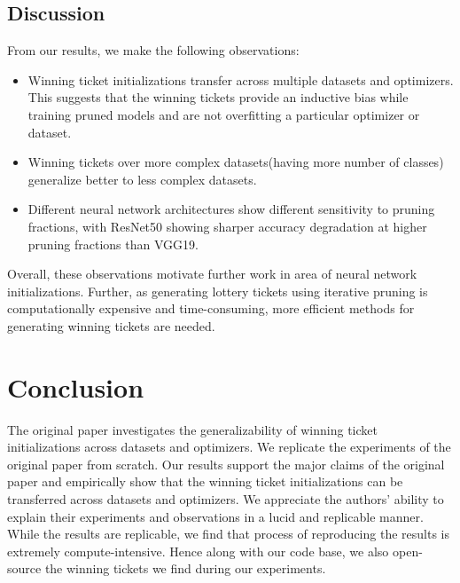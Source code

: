     \subsection{Discussion}
     From our results, we make the following observations:
    \begin{itemize}
        \item Winning ticket initializations transfer across multiple datasets and optimizers. This suggests that the winning tickets provide an inductive bias while training pruned models  and are not overfitting a particular optimizer or dataset.
        \item Winning tickets over more complex datasets(having more number of classes) generalize better to less complex datasets.
        \item  Different neural network architectures show different sensitivity to pruning fractions, with ResNet50 showing sharper accuracy degradation at higher pruning fractions than VGG19.
    \end{itemize}
     Overall, these observations motivate further work in area of neural network initializations. Further, as generating lottery tickets using iterative pruning is computationally expensive and time-consuming, more efficient methods for generating winning tickets are needed.
    
    

    \section{Conclusion}
    The original paper \cite{repro_paper} investigates the generalizability of winning ticket initializations across datasets and optimizers. We replicate the experiments of the original paper from scratch. Our results support the major claims of the original paper and empirically show that the winning ticket initializations can be transferred across datasets and optimizers. We appreciate the authors' ability to explain their experiments and observations in a lucid and replicable manner. While the results are replicable, we find that process of reproducing the results is extremely compute-intensive. Hence along with our code base, we also open-source the winning tickets we find during our experiments.
    

